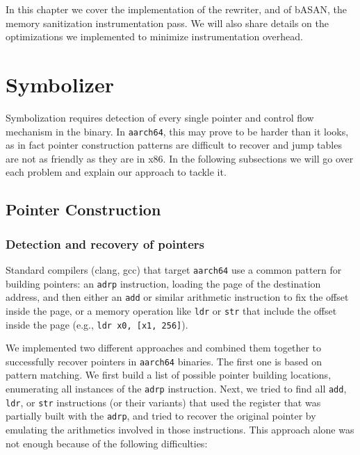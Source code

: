 \documentclass[a4paper,11pt,oneside]{report}
\begin{document}

In this chapter we cover the implementation of the rewriter, and of bASAN, the memory
sanitization instrumentation pass. We will also share details on the optimizations
we implemented to minimize instrumentation overhead.

\section{Symbolizer}


Symbolization requires detection of every single pointer and control flow
mechanism in the binary. In \texttt{aarch64}, this may prove to be harder than
it looks, as in fact pointer construction patterns are difficult to recover
and jump tables are not as friendly as they are in x86. 
In the following subsections we will go over each problem and explain our
approach to tackle it. 



\subsection{Pointer Construction}

\subsubsection{Detection and recovery of pointers}

Standard compilers (clang, gcc) that target \texttt{aarch64} use a common 
pattern for building pointers: an \texttt{adrp} instruction, loading the page 
of the destination address, and then either an \texttt{add} or similar arithmetic 
instruction to fix the offset inside the page, or a memory operation like 
\texttt{ldr} or \texttt{str} that include the offset inside the page 
(e.g., \texttt{ldr x0, [x1, 256]}).

We implemented two different approaches and combined them together to 
successfully recover pointers in \texttt{aarch64} binaries.
The first one is based on pattern matching. We first build a list of 
possible pointer building locations, enumerating all instances of the \texttt{adrp} 
instruction. Next, we tried to find all \texttt{add}, \texttt{ldr}, or 
\texttt{str} instructions (or their variants) that used the register that was 
partially built with the \texttt{adrp}, and tried to recover the original
pointer by emulating the arithmetics involved in those instructions.
This approach alone was not enough because of the following 
difficulties:
\end{document}
